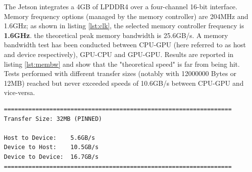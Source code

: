 \documentclass{article}
\begin{document}
The Jetson integrates a 4GB of LPDDR4 over a four-channel 16-bit interface. Memory frequency options (managed by the memory controller) are 204MHz and 1.6GHz; as shown in listing \ref{lst:clk}, the selected memory controller frequency is \textbf{1.6GHz}. the theoretical peak memory bandwidth is 25.6GB/s. A memory bandwidth test has been conducted between CPU-GPU (here referred to as host and device respectively), GPU-CPU and GPU-GPU. Results are reported in listing \ref{lst:membw} and show that the "theoretical speed" is far from being hit. Tests performed with different transfer sizes (notably with 12000000 Bytes or 12MB) reached but never exceeded speeds of 10.6GB/s between CPU-GPU and vice-versa.
\begin{lstlisting}[caption=CUDA Memory Bandwidth Test within NVIDIA Tegra X1]
=================================================================
Transfer Size: 32MB (PINNED)

Host to Device:    5.6GB/s
Device to Host:    10.5GB/s
Device to Device:  16.7GB/s
=================================================================
\end{lstlisting}\label{lst:membw}
\end{document}

